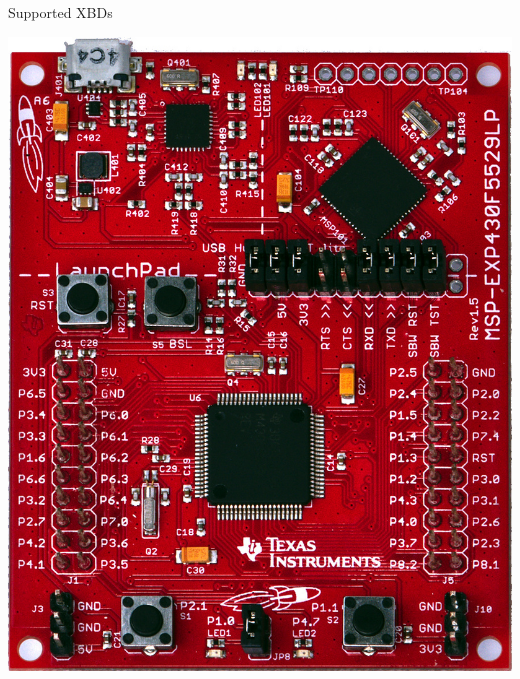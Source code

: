 \documentclass[xcolor=pdftex,dvipsnames,table,final]{beamer}
\begin{document}
\begin{frame}[fragile]{}
\begin{columns}[t, totalwidth=\textwidth]
\begin{column}{.675\linewidth}
\begin{columns}
\begin{column}{0.977\linewidth}
\begin{block}{Supported XBDs}
\begin{minipage}{0.15\linewidth}
		\includegraphics[scale=0.9]{../figures/msp-exp430f5529lp}
        \end{minipage}%
       \end{block}
\end{column}
\end{columns}
     
\end{column}
\end{columns}

\end{frame}
\end{document}
